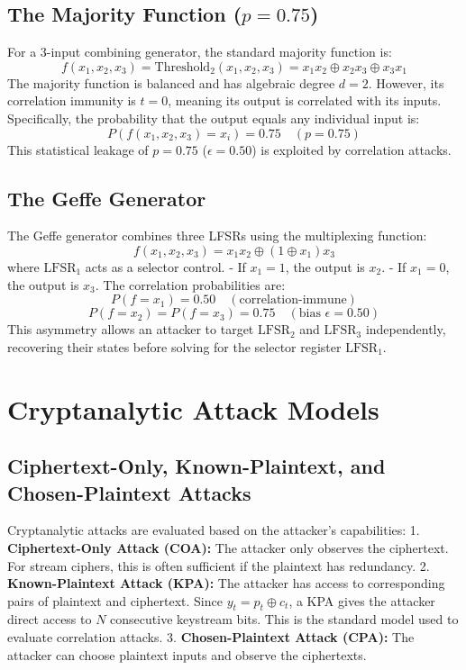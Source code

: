 \subsection{The Majority Function ($p = 0.75$)}
For a 3-input combining generator, the standard majority function is:
$$f(x_1, x_2, x_3) = \text{Threshold}_2(x_1, x_2, x_3) = x_1 x_2 \oplus x_2 x_3 \oplus x_3 x_1$$
The majority function is balanced and has algebraic degree $d=2$. However, its correlation immunity is $t=0$, meaning its output is correlated with its inputs. Specifically, the probability that the output equals any individual input is:
$$P(f(x_1, x_2, x_3) = x_i) = 0.75 \quad (p = 0.75)$$
This statistical leakage of $p = 0.75$ ($\epsilon = 0.50$) is exploited by correlation attacks.

\subsection{The Geffe Generator}
The Geffe generator combines three LFSRs using the multiplexing function:
$$f(x_1, x_2, x_3) = x_1 x_2 \oplus (1 \oplus x_1) x_3$$
where $\text{LFSR}_1$ acts as a selector control.
- If $x_1 = 1$, the output is $x_2$.
- If $x_1 = 0$, the output is $x_3$.
The correlation probabilities are:
$$P(f = x_1) = 0.50 \quad (\text{correlation-immune})$$
$$P(f = x_2) = P(f = x_3) = 0.75 \quad (\text{bias } \epsilon = 0.50)$$
This asymmetry allows an attacker to target $\text{LFSR}_2$ and $\text{LFSR}_3$ independently, recovering their states before solving for the selector register $\text{LFSR}_1$.

\section{Cryptanalytic Attack Models}
\label{sec:attack_models}

\subsection{Ciphertext-Only, Known-Plaintext, and Chosen-Plaintext Attacks}
Cryptanalytic attacks are evaluated based on the attacker's capabilities:
1.  \textbf{Ciphertext-Only Attack (COA):} The attacker only observes the ciphertext. For stream ciphers, this is often sufficient if the plaintext has redundancy.
2.  \textbf{Known-Plaintext Attack (KPA):} The attacker has access to corresponding pairs of plaintext and ciphertext. Since $y_t = p_t \oplus c_t$, a KPA gives the attacker direct access to $N$ consecutive keystream bits. This is the standard model used to evaluate correlation attacks.
3.  \textbf{Chosen-Plaintext Attack (CPA):} The attacker can choose plaintext inputs and observe the ciphertexts.

